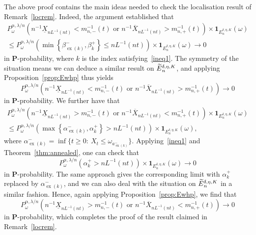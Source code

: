 \documentclass[AHL,Unicode,longabstracts,published]{cedram}
\newcommand{\bfP}{\mathbf{P}}
\newcommand{\bfun}{\mathbf{1}}
\newcommand\ex{\operatorname{ex}}
\newcommand{\aat}[1]{a_{\ex(#1)}^-}
\newcommand{\betat}[1]{\beta^-_{\ex(#1)}}
\newcommand{\alphat}[1]{\alpha^-_{\ex(#1)}}
\let\oldtilde\tilde
\renewcommand*{\tilde}[1]{\mathchoice{\widetilde{#1}}{\widetilde{#1}}{\oldtilde{#1}}{\oldtilde{#1}}}
\begin{document}
\begin{rema}\label{locremproof}
The above proof contains the main ideas needed to check the localisation result of Remark~\ref{locrem}. Indeed, the argument established that
\begin{multline*}
{P}^{\alpha,\lambda/n}_\omega\left(n^{-1}\underline{X}_{nL^{-1}(n t)}<m_{n,-}^{-1}(t)\text{ or }n^{-1}\overline{X}_{nL^{-1}(n t)}>m_{n,+}^{-1}(t)\right)\times\bfun_{E_n^{\delta,\eta,K}}(\omega)\\
\leq{P}^{\alpha,\lambda/n}_\omega\left(\min\left\{\betat{k},{\beta}_k^+\right\}\leq nL^{-1}(nt)\right)\times\bfun_{E_n^{\delta,\eta,K}}(\omega)\rightarrow 0
\end{multline*}
in $\bfP$-probability, where $k$ is the index satisfying~\eqref{ineq1}. The symmetry of the situation means we can deduce a similar result on $\tilde{E}_n^{\delta,\eta,K}$, and applying Proposition~\ref{prop:Ewhp} thus yields
\[
{P}^{\alpha,\lambda/n}_\omega\left(n^{-1}\underline{X}_{nL^{-1}(n t)}<m_{n,-}^{-1}(t)\text{ or }n^{-1}\overline{X}_{nL^{-1}(n t)}>m_{n,+}^{-1}(t)\right)\rightarrow 0
\]
in $\bfP$-probability. We further have that
\begin{multline*}
{P}^{\alpha,\lambda/n}_\omega\left(n^{-1}\underline{X}_{nL^{-1}(n t)}>m_{n,-}^{-1}(t)\text{ or }n^{-1}\overline{X}_{nL^{-1}(n t)}<m_{n,+}^{-1}(t)\right)\times\bfun_{E_n^{\delta,\eta,K}}(\omega)\\
\leq{P}^{\alpha,\lambda/n}_\omega\left(\max\left\{\alphat{k},{\alpha}_k^+\right\}> nL^{-1}(nt)\right)\times\bfun_{E_n^{\delta,\eta,K}}(\omega),
\end{multline*}
where $\alphat{k}=\inf\{t\geq 0:\:X_t\leq \omega_{\aat{k}}\}$. Applying~\eqref{ineq1} and Theorem~\ref{thm:annealed}, one can check that
\[
{P}^{\alpha,\lambda/n}_\omega\left({\alpha}_k^+> nL^{-1}(nt)\right)\times\bfun_{E_n^{\delta,\eta,K}}(\omega)\rightarrow 0
\]
in $\bfP$-probability. The same approach gives the corresponding limit with ${\alpha}_k^+$ replaced by $\alphat{k}$, and we can also deal with the situation on $\tilde{E}_n^{\delta,\eta,K}$ in a similar fashion. Hence, again applying Proposition~\ref{prop:Ewhp}, we find that
\[
{P}^{\alpha,\lambda/n}_\omega\left(n^{-1}\underline{X}_{nL^{-1}(n t)}>m_{n,-}^{-1}(t)\text{ or }n^{-1}\overline{X}_{nL^{-1}(n t)}<m_{n,+}^{-1}(t)\right)\rightarrow 0
\]
in $\bfP$-probability, which completes the proof of the result claimed in Remark~\ref{locrem}.
\end{rema}
\end{document}
